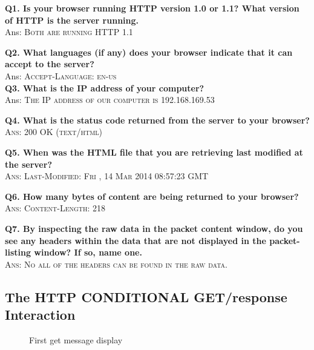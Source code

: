 \documentclass[11pt]{article}
\numberwithin{equation}{section}
\begin{document}
\textbf{Q1. Is your browser running HTTP version 1.0 or 1.1? What version of HTTP is the server running.} \\
Ans: \textsc{Both are running HTTP 1.1} \newline

\textbf{Q2. What languages (if any) does your browser indicate that it can accept to the server?} \\
Ans: \textsc{Accept-Language: en-us} \\

\textbf{Q3. What is the IP address of your computer?} \\
Ans: \textsc{The IP address of our computer is 192.168.169.53} \newline

\textbf{Q4. What is the status code returned from the server to your browser?} \\
\textsc{Ans: 200 OK (text/html)}  \newline

\textbf{Q5. When was the HTML file that you are retrieving last modified at the server?} \\
\textsc{Ans: Last-Modified: Fri , 14 Mar 2014 08:57:23 GMT} \newline

\textbf{Q6. How many bytes of content are being returned to your browser?} \\
\textsc{Ans: Content-Length: 218} \newline

\textbf{Q7. By inspecting the raw data in the packet content window, do you see any headers within the data that are not displayed in the packet-listing window? If so, name one.}\\
\textsc{Ans: No all of the headers can be found in the raw data.} \newline

\subsection*{The HTTP CONDITIONAL GET/response Interaction}

\begin{figure}[H]
\begin{center}
		\centering
		\caption{First get message display}
		\label{fig:q1_f1_a}
\end{center}
\end{figure} 
\end{document}
